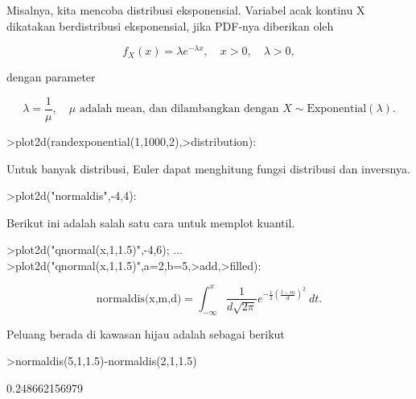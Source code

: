 \documentclass[a4paper,10pt]{article}
\begin{document}
\begin{eulernotebook}
\begin{eulercomment}
\begin{eulercomment}
\begin{eulercomment}
Misalnya, kita mencoba distribusi eksponensial. Variabel acak kontinu
X dikatakan berdistribusi eksponensial, jika PDF-nya diberikan oleh\\
\end{eulercomment}
\begin{eulerformula}
\[
f_X(x)=\lambda e^{-\lambda x},\quad x>0,\quad \lambda>0,
\]
\end{eulerformula}
\begin{eulercomment}
dengan parameter\\
\end{eulercomment}
\begin{eulerformula}
\[
\lambda=\frac{1}{\mu},\quad \mu \text{ adalah mean, dan dilambangkan dengan } X \sim \text{Exponential}(\lambda).
\]
\end{eulerformula}
\begin{eulerprompt}
>plot2d(randexponential(1,1000,2),>distribution):
\end{eulerprompt}
\begin{eulercomment}
Untuk banyak distribusi, Euler dapat menghitung fungsi distribusi dan
inversnya.
\end{eulercomment}
\begin{eulerprompt}
>plot2d("normaldis",-4,4): 
\end{eulerprompt}
\begin{eulercomment}
Berikut ini adalah salah satu cara untuk memplot kuantil.
\end{eulercomment}
\begin{eulerprompt}
>plot2d("qnormal(x,1,1.5)",-4,6);  ...
>plot2d("qnormal(x,1,1.5)",a=2,b=5,>add,>filled):
\end{eulerprompt}
\begin{eulerformula}
\[
\text{normaldis(x,m,d)}=\int_{-\infty}^x \frac{1}{d\sqrt{2\pi}}e^{-\frac{1}{2}(\frac{t-m}{d})^2}\ dt.
\]
\end{eulerformula}
\begin{eulercomment}
Peluang berada di kawasan hijau adalah sebagai berikut
\end{eulercomment}
\begin{eulerprompt}
>normaldis(5,1,1.5)-normaldis(2,1,1.5)
\end{eulerprompt}
\begin{euleroutput}
  0.248662156979

\end{euleroutput}
\end{eulercomment}
\end{eulercomment}
\end{eulernotebook}
\end{document}
